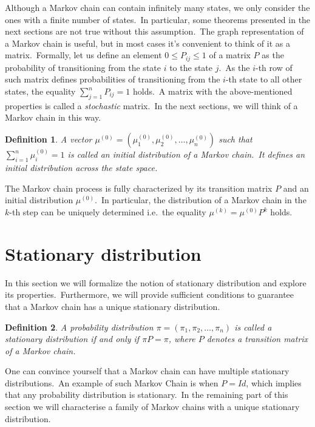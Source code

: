 \documentclass[a4paper, 11pt, onecolumn, openany, titlepage]{report}
\theoremstyle{default_theorem_style}\newtheorem{theorem}{Theorem}
\theoremstyle{default_theorem_style}\newtheorem{definition}{Definition}
\begin{document}
Although a Markov chain can contain infinitely many states, we only consider
the ones with a finite number of states.\ In particular, some theorems presented in the next sections
are not true without this assumption.\ The graph representation of a Markov chain is useful, but in most cases
it's convenient to think of it as a matrix.\ Formally, let us define an element $0 \leq P_{ij} \leq 1$ of a matrix
$P$ as the probability of transitioning from the state $i$ to the state $j$.\ As the $i$-th row of such matrix
defines probabilities of transitioning from the $i$-th  state to all other states, the equality
$\sum_{j = 1}^{n} P_{ij} = 1$ holds.\ A matrix with the above-mentioned properties is called a
\textit{stochastic} matrix.\ In the next sections, we will think of a Markov chain in this way.

\begin{definition}
A vector $\mu^{(0)} = (\mu^{(0)}_1, \mu^{(0)}_2, \dots, \mu^{(0)}_n)$ such that $\sum_{i=1}^{n} \mu^{(0)}_i = 1$
is called an \textit{initial distribution} of a Markov chain.\ It defines an initial distribution across the state space.

\end{definition}

The Markov chain process is fully characterized by its transition matrix $P$ and an initial distribution $\mu^{(0)}$.\ In
particular, the distribution of a Markov chain in the $k$-th step can be uniquely determined i.e.\ the equality
$\mu^{(k)} = \mu^{(0)}P^k$ holds.\newline

\section{Stationary distribution}

In this section we will formalize the notion of stationary distribution and explore its properties.\ Furthermore,
we will provide sufficient conditions to guarantee that a Markov chain has a unique stationary distribution.

\begin{definition}
A probability distribution $\pi = (\pi_1, \pi_2, \dots, \pi_n)$ is called a \textit{stationary} distribution if and only if
$\pi P = \pi$, where $P$ denotes a transition matrix of a Markov chain.
\end{definition}

One can convince yourself that a Markov chain can have multiple stationary distributions.\ An example of such Markov
Chain is when $P = Id$, which implies that any probability distribution is stationary.\ In the remaining part of this
section we will characterise a family of Markov chains with a unique stationary distribution.
\end{document}

